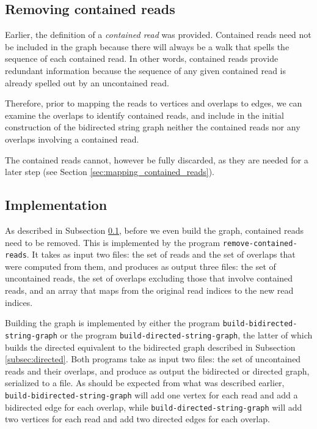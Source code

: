 \documentclass[10pt]{article}
\newcommand{\Section}[1]{Section \ref{#1}}
\newcommand{\Subsection}[1]{Subsection \ref{#1}}
\newcommand{\KeyTerm}[1]{{\it #1}}
\newcommand{\ProgramName}[1]{{\tt #1}}
\begin{document}
\subsection{Removing contained reads}

\label{subsec:removing_contained_reads}

Earlier, the definition of a \KeyTerm{contained read} was provided.  Contained
reads need not be included in the graph because there will always be a walk that
spells the sequence of each contained read.  In other words, contained reads
provide redundant information because the sequence of any given contained read
is already spelled out by an uncontained read.

Therefore, prior to mapping the reads to vertices and overlaps to edges, we can
examine the overlaps to identify contained reads, and include in the initial
construction of the bidirected string graph neither the contained reads nor any
overlaps involving a contained read.

The contained reads cannot, however be fully discarded, as they are needed for a
later step (see \Section{sec:mapping_contained_reads}).

\subsection{Implementation}

As described in \Subsection{subsec:removing_contained_reads}, before we even
build the graph, contained reads need to be removed.  This is implemented by the
program \ProgramName{remove-contained-reads}.  It takes as input two files: the
set of reads and the set of overlaps that were computed from them, and produces
as output three files: the set of uncontained reads, the set of overlaps
excluding those that involve contained reads, and an array that maps from the
original read indices to the new read indices.

Building the graph is implemented by either the program
\ProgramName{build-bidirected-string-graph} or the program
\ProgramName{build-directed-string-graph}, the latter of which builds the
directed equivalent to the bidirected graph described in
\Subsection{subsec:directed}.  Both programs take as input two files: the set of
uncontained reads and their overlaps, and produce as output the bidirected or
directed graph, serialized to a file.  As should be expected from what was
described earlier, \ProgramName{build-bidirected-string-graph} will add one
vertex for each read and add a bidirected edge for each overlap, while
\ProgramName{build-directed-string-graph} will add two vertices for each read
and add two directed edges for each overlap.
\end{document}

